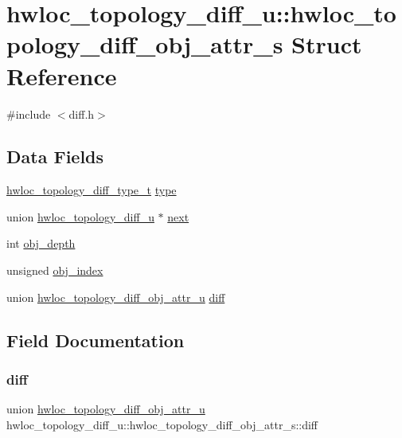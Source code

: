\hypertarget{a00358}{}\section{hwloc\+\_\+topology\+\_\+diff\+\_\+u\+:\+:hwloc\+\_\+topology\+\_\+diff\+\_\+obj\+\_\+attr\+\_\+s Struct Reference}
\label{a00358}


{\ttfamily \#include $<$diff.\+h$>$}

\subsection*{Data Fields}
\begin{DoxyCompactItemize}
\item 
\hyperlink{a00225_ga4b86adb00c8b2d09ebc4ef8f3bfd92b2}{hwloc\+\_\+topology\+\_\+diff\+\_\+type\+\_\+t} \hyperlink{a00358_a70a118ad288bd98f18c8ce6dc52e2d10}{type}
\item 
union \hyperlink{a00350}{hwloc\+\_\+topology\+\_\+diff\+\_\+u} $\ast$ \hyperlink{a00358_acb9170a8eb3392656d70f7f3ef3e3eed}{next}
\item 
int \hyperlink{a00358_a82c1d4bab80b9e0bf301a9d8291893e0}{obj\+\_\+depth}
\item 
unsigned \hyperlink{a00358_adb9f4d414470b6670cde8d90759a6c1c}{obj\+\_\+index}
\item 
union \hyperlink{a00334}{hwloc\+\_\+topology\+\_\+diff\+\_\+obj\+\_\+attr\+\_\+u} \hyperlink{a00358_a91f0645f9062e892652357cd141c8ebb}{diff}
\end{DoxyCompactItemize}


\subsection{Field Documentation}
\mbox{\label{a00358_a91f0645f9062e892652357cd141c8ebb}} 
\subsubsection{\texorpdfstring{diff}{diff}}
{\footnotesize\ttfamily union \hyperlink{a00334}{hwloc\+\_\+topology\+\_\+diff\+\_\+obj\+\_\+attr\+\_\+u} hwloc\+\_\+topology\+\_\+diff\+\_\+u\+::hwloc\+\_\+topology\+\_\+diff\+\_\+obj\+\_\+attr\+\_\+s\+::diff}

